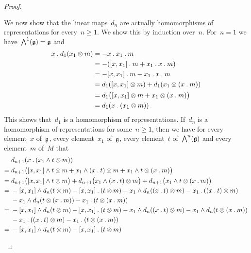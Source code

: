 \begin{proof}
\begin{enumerate}
			We now show that the linear maps~$d_n$ are actually homomorphisms of representations for every~$n \geq 1$.
			We show this by induction over~$n$.
			For~$n = 1$ we have~$\operatorname{\bigwedge}^1(\mathfrak{g}) = \mathfrak{g}$ and
			\begin{align*}
				x \mathbin{.} d_1(x_1 \otimes m)
				&=
				- x \mathbin{.} x_1 \mathbin{.} m
				\\
				&=
				- ( [x, x_1] \mathbin{.} m + x_1 \mathbin{.} x \mathbin{.} m )
				\\
				&=
				- [x, x_1] \mathbin{.} m - x_1 \mathbin{.} x \mathbin{.} m
				\\
				&=
				d_1( [x, x_1] \otimes m )
				+ d_1( x_1 \otimes (x \mathbin{.} m) )
				\\
				&=
				d_1\bigl( [x, x_1] \otimes m + x_1 \otimes (x \mathbin{.} m) \bigr)
				\\
				&=
				d_1( x \mathbin{.} (x_1 \otimes m) ) \,.
			\end{align*}
			This shows that~$d_1$ is a homomorphism of representations.
			If~$d_n$ is a homomorphism of representations for some~$n \geq 1$, then we have for every element~$x$ of~$\mathfrak{g}$, every element~$x_1$ of~$\mathfrak{g}$, every element~$t$ of~$\operatorname{\bigwedge}^n(\mathfrak{g})$ and every element~$m$ of~$M$ that
			\begingroup
			\allowdisplaybreaks
			\begin{align*}
				{}&
				d_{n+1}( x \act (x_1 \wedge t \tensor m) )
				\\
				={}&
				d_{n+1}
				\bigl(
					[x, x_1] \wedge t \tensor m
					+ x_1 \wedge (x \act t) \tensor m
					+ x_1 \wedge t \tensor (x \act m)
				\bigr)
				\\
				={}&
				d_{n+1}\bigl( [x, x_1] \wedge t \tensor m \bigr)
				+ d_{n+1}\bigl( x_1 \wedge (x \act t) \tensor m \bigr)
				+ d_{n+1}\bigl( x_1 \wedge t \tensor (x \act m) \bigr)
				\\
				={}&
				- [x, x_1] \wedge d_n(t \tensor m)
				- [x, x_1] \act (t \tensor m)
				- x_1 \wedge d_n( (x \act t) \tensor m )
				- x_1 \act ( (x \act t) \tensor m )
				\\
				{}&
				- x_1 \wedge d_n( t \tensor (x \act m) )
				- x_1 \act ( t \tensor (x \act m) )
				\\
				={}&
				- [x, x_1] \wedge d_n(t \tensor m)
				- [x, x_1] \act (t \tensor m)
				- x_1 \wedge d_n( (x \act t) \tensor m )
				- x_1 \wedge d_n( t \tensor (x \act m) )
				\\
				{}&
				- x_1 \act ( (x \act t) \tensor m )
				- x_1 \act ( t \tensor (x \act m) )
				\\
				={}&
				- [x, x_1] \wedge d_n(t \tensor m)
				- [x, x_1] \act (t \tensor m)

\end{align*}
\end{enumerate}
\end{proof}
